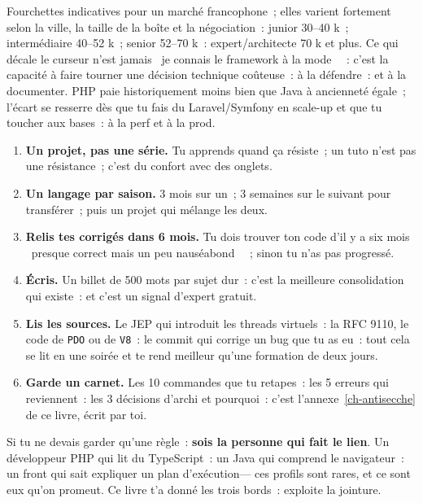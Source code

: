 Fourchettes indicatives pour un march\'e francophone~; elles varient fortement selon la ville, la
taille de la bo\^ite et la n\'egociation~: junior 30--40 k\texteuro{}~; interm\'ediaire 40--52 k\texteuro{}~;
senior 52--70 k\texteuro{}~: expert/architecte 70 k\texteuro{} et plus. Ce qui d\'ecale le curseur n'est
jamais \og ~je connais le framework \`a la mode~ \fg{}~: c'est la capacit\'e \`a faire tourner une d\'ecision
technique co\^uteuse~: \`a la d\'efendre~: et \`a la documenter. PHP paie historiquement moins bien que Java
\`a anciennet\'e \'egale~; l'\'ecart se resserre d\`es que tu fais du Laravel/Symfony en scale-up et que tu
toucher aux bases~: \`a la perf et \`a la prod.

\begin{enumerate}
  \item \textbf{Un projet, pas une s\'erie.} Tu apprends quand \c{c}a r\'esiste~; un tuto n'est pas une
        r\'esistance~; c'est du confort avec des onglets.
  \item \textbf{Un langage par saison.} 3 mois sur un~; 3 semaines sur le suivant pour transf\'erer~;
        puis un projet qui m\'elange les deux.
  \item \textbf{Relis tes corrig\'es dans 6 mois.} Tu dois trouver ton code d'il y a six mois
        \og ~presque correct mais un peu naus\'eabond~ \fg{}~; sinon tu n'as pas progress\'e.
  \item \textbf{\'Ecris.} Un billet de 500 mots par sujet dur~: c'est la meilleure consolidation
        qui existe~: et c'est un signal d'expert gratuit.
  \item \textbf{Lis les sources.} Le JEP qui introduit les threads virtuels~: la RFC 9110, le code
        de \verb|PDO| ou de \verb|V8|~: le commit qui corrige un bug que tu as eu~: tout cela se lit
        en une soir\'ee et te rend meilleur qu'une formation de deux jours.
  \item \textbf{Garde un carnet.} Les 10 commandes que tu retapes~: les 5 erreurs qui reviennent~:
        les 3 d\'ecisions d'archi et pourquoi~: c'est l'annexe~\ref{ch-antisecche} de ce livre, \'ecrit par toi.
\end{enumerate}

\begin{astuce}
Si tu ne devais garder qu'une r\`egle~: \textbf{sois la personne qui fait le lien}. Un d\'eveloppeur PHP
qui lit du TypeScript~: un Java qui comprend le navigateur~: un front qui sait expliquer un plan
d'ex\'ecution--- ces profils sont rares, et ce sont eux qu'on promeut. Ce livre t'a donn\'e les trois
bords~: exploite la jointure.
\end{astuce}

